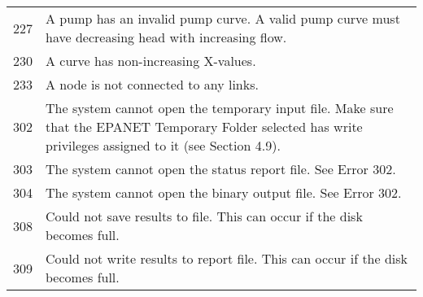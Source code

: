 \begin{longtable}{ c p{12cm}}
227& A pump has an invalid pump curve. A valid pump curve must have
decreasing head with increasing flow. \\[6pt]

230& A curve has non-increasing X-values. \\[6pt]

233& A node is not connected to any links.\\[6pt]

302& The system cannot open the temporary input file. Make sure that the
EPANET Temporary Folder selected has write privileges assigned to it (see
Section 4.9). \\[6pt]

303& The system cannot open the status report file. See Error 302.\\[6pt]

304& The system cannot open the binary output file. See Error 302.  \\[6pt]

308& Could not save results to file. This can occur if the disk becomes full.\\[6pt]

309& Could not write results to report file. This can occur if the disk becomes full.\\[6pt]
\hline
\end{longtable}
